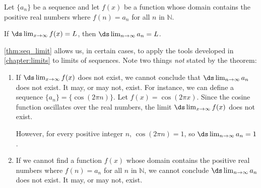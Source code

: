 \begin{theorem}\label{thm:seq_limit}
Let $\{a_n\}$ be a sequence and let $f(x)$ be a function whose domain contains the positive real numbers where $f(n) = a_n$ for all $n$ in $\mathbb{N}$.\bigskip

If $\ds \lim_{x\to\infty} f(x) = L$, then $\ds\lim_{n\to\infty} a_n = L$.
\end{theorem}

\autoref{thm:seq_limit} allows us, in certain cases, to apply the tools developed in \autoref{chapter:limits} to limits of sequences. Note two things \emph{not} stated by the theorem:
	\begin{enumerate}
		\item If $\ds \lim_{x\to\infty}f(x)$ does not exist, we cannot conclude that $\ds\lim_{n\to\infty} a_n$ does not exist. It may, or may not, exist. For instance, we can define a sequence $\{a_n\} = \{\cos(2\pi n)\}$. Let $f(x) = \cos (2\pi x)$. Since the cosine function oscillates over the real numbers, the limit $\ds \lim_{x\to\infty}f(x)$ does not exist. 
		
		However, for every positive integer $n$, $\cos(2\pi n) = 1$, so $\ds \lim_{n\to\infty} a_n = 1$.
		
		\item	If we cannot find a function $f(x)$ whose domain contains the positive real numbers where $f(n) = a_n$ for all $n$ in $\mathbb{N}$, we cannot conclude $\ds\lim_{n\to\infty} a_n$ does not exist. It may, or may not, exist.
	\end{enumerate}


